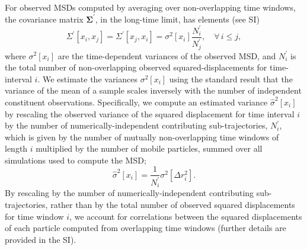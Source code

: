 \documentclass[reprint,superscriptaddress,nobibnotes,amsmath,amssymb,aps,prx,hidelinks]{revtex4-2}
\newcommand{\oMSDi}{\ensuremath{x_i}}
\newcommand{\oMSDj}{\ensuremath{x_j}}
\newcommand{\nind}[1]{\ensuremath{N^\prime_{#1}}}
\newcommand{\var}[1]{\ensuremath{\sigma^2[#1]}}
\newcommand{\varest}[1]{\ensuremath{\widehat{\sigma}^2[#1]}}
\begin{document}
For observed MSDs computed by averaging over non-overlapping time windows, the covariance matrix $\mathbf{\Sigma^\prime}$, in the long-time limit, has elements (see SI)
\begin{equation}
  \Sigma^\prime\left[\oMSDi, \oMSDj\right]= \Sigma^\prime\left[\oMSDj, \oMSDi\right] =
  \var{\oMSDi} \frac{\nind{i}}{\nind{j}},\hspace{1em} \forall\,i \leq j,
  \label{equ:cvv}
\end{equation} 
where $\var{\oMSDi}$ are the time-dependent variances of the observed MSD, and $\nind{i}$ is the total number of non-overlapping observed squared-displacements for time-interval $i$.
We estimate the variances $\var{\oMSDi}$ using the standard result that the variance of the mean of a sample scales inversely with the number of independent constituent observations.
Specifically, we compute an estimated variance $\varest{\oMSDi}$ by rescaling the observed variance of the squared displacement for time interval $i$ by the number of numerically-independent contributing sub-trajectories, $\nind{i}$, which is given by the number of mutually non-overlapping time windows of length $i$ multiplied by the number of mobile particles, summed over all simulations used to compute the MSD;
\begin{equation}
  \varest{\oMSDi} = \frac{1}{\nind{i}}\var{\Delta r_i^2}.
  \label{equ:varestMSD}
\end{equation}
By rescaling by the number of numerically-independent contributing sub-trajectories, rather than by the total number of observed squared displacements for time window $i$, we account for correlations between the squared displacements of each particle computed from overlapping time windows (further details are provided in the SI).
\end{document}
